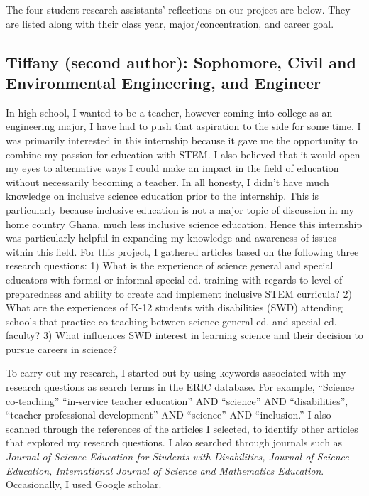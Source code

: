\documentclass[11.5pt]{sig-alternate}
\begin{document}
\begin{large}
The four student research assistants’ reflections on our project are below.  They are listed along with their class year, major/concentration, and career goal. 

\subsection*{Tiffany (second author): Sophomore, Civil and Environmental Engineering, and Engineer}

In high school, I wanted to be a teacher, however coming into college as an engineering major, I have had to push that aspiration to the side for some time. I was primarily interested in this internship because it gave me the opportunity to combine my passion for education with STEM. I also believed that it would open my eyes to alternative ways I could make an impact in the field of education without necessarily becoming a teacher. In all honesty, I didn’t have much knowledge on inclusive science education prior to the internship. This is particularly because inclusive education is not a major topic of discussion in my home country Ghana, much less inclusive science education. Hence this internship was particularly helpful in expanding my knowledge and awareness of issues within this field. For this project, I gathered articles based on the following  three research questions: 1) What is the experience of science general and special educators with formal or informal special ed. training with regards to level of preparedness and ability to create and implement inclusive STEM curricula? 2) What are the experiences of K-12 students with disabilities (SWD) attending schools that practice co-teaching between science general ed. and special ed. faculty? 3) What influences SWD interest in learning science and their decision to pursue careers in science?

To carry out my research, I started out by using keywords associated with my research questions as search terms in the ERIC database. For example, “Science co-teaching” “in-service teacher education” AND “science” AND “disabilities”, “teacher professional development” AND “science” AND “inclusion.” I also scanned through the references of the articles I selected, to identify other articles that explored my research questions. I also searched through journals such as \textit{Journal of Science Education for Students with Disabilities, Journal of Science Education, International Journal of Science and Mathematics Education}. Occasionally, I used Google scholar. 


\end{large}
\end{document}
